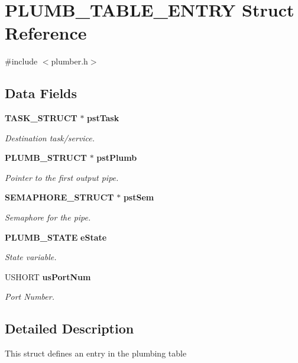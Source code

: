 \section{PLUMB\_\-TABLE\_\-ENTRY Struct Reference}
\label{struct_p_l_u_m_b___t_a_b_l_e___e_n_t_r_y}


{\ttfamily \#include $<$plumber.h$>$}\subsection*{Data Fields}
\begin{DoxyCompactItemize}
\item 
{\bf TASK\_\-STRUCT} $\ast$ {\bf pstTask}
\begin{DoxyCompactList}\small\item\em Destination task/service. \item\end{DoxyCompactList}\item 
{\bf PLUMB\_\-STRUCT} $\ast$ {\bf pstPlumb}
\begin{DoxyCompactList}\small\item\em Pointer to the first output pipe. \item\end{DoxyCompactList}\item 
{\bf SEMAPHORE\_\-STRUCT} $\ast$ {\bf pstSem}
\begin{DoxyCompactList}\small\item\em Semaphore for the pipe. \item\end{DoxyCompactList}\item 
{\bf PLUMB\_\-STATE} {\bf eState}
\begin{DoxyCompactList}\small\item\em State variable. \item\end{DoxyCompactList}\item 
USHORT {\bf usPortNum}
\begin{DoxyCompactList}\small\item\em Port Number. \item\end{DoxyCompactList}\end{DoxyCompactItemize}


\subsection{Detailed Description}
This struct defines an entry in the plumbing table 

